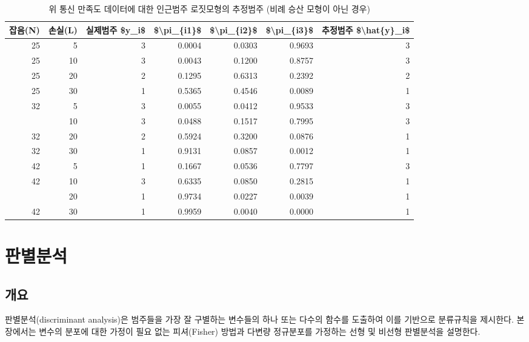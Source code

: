 \documentclass[]{book}
\begin{document}
\begin{table}[t]

\caption{\label{tab:adjacent-category-logit-prediction-nonproportional}위 통신 만족도 데이터에 대한 인근범주 로짓모형의 추정범주 (비례 승산 모형이 아닌 경우)}
\centering
\begin{tabular}{rrrrrrr}
\toprule
잡음(N) & 손실(L) & 실제범주 \$y\_i\$ & \$\textbackslash{}pi\_\{i1\}\$ & \$\textbackslash{}pi\_\{i2\}\$ & \$\textbackslash{}pi\_\{i3\}\$ & 추정범주 \$\textbackslash{}hat\{y\}\_i\$\\
\midrule
25 & 5 & 3 & 0.0004 & 0.0303 & 0.9693 & 3\\
25 & 10 & 3 & 0.0043 & 0.1200 & 0.8757 & 3\\
25 & 20 & 2 & 0.1295 & 0.6313 & 0.2392 & 2\\
25 & 30 & 1 & 0.5365 & 0.4546 & 0.0089 & 1\\
32 & 5 & 3 & 0.0055 & 0.0412 & 0.9533 & 3\\
\addlinespace
32 & 10 & 3 & 0.0488 & 0.1517 & 0.7995 & 3\\
32 & 20 & 2 & 0.5924 & 0.3200 & 0.0876 & 1\\
32 & 30 & 1 & 0.9131 & 0.0857 & 0.0012 & 1\\
42 & 5 & 1 & 0.1667 & 0.0536 & 0.7797 & 3\\
42 & 10 & 3 & 0.6335 & 0.0850 & 0.2815 & 1\\
\addlinespace
42 & 20 & 1 & 0.9734 & 0.0227 & 0.0039 & 1\\
42 & 30 & 1 & 0.9959 & 0.0040 & 0.0000 & 1\\
\bottomrule
\end{tabular}
\end{table}

\hypertarget{da}{%
\chapter{판별분석}\label{da}}

\hypertarget{da-overview}{%
\section{개요}\label{da-overview}}

판별분석(discriminant analysis)은 범주들을 가장 잘 구별하는 변수들의 하나 또는 다수의 함수를 도출하여 이를 기반으로 분류규칙을 제시한다. 본 장에서는 변수의 분포에 대한 가정이 필요 없는 피셔(Fisher) 방법과 다변량 정규분포를 가정하는 선형 및 비선형 판별분석을 설명한다.
\end{document}
